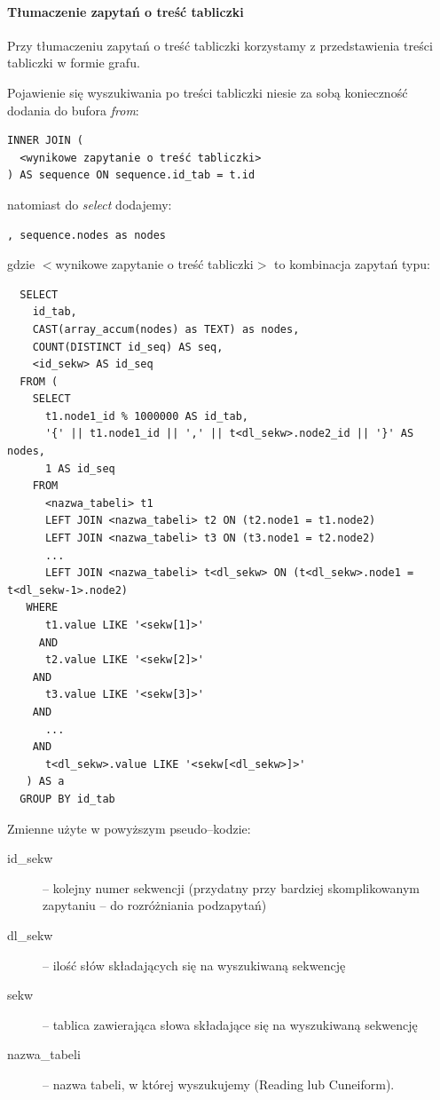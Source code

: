 \paragraph{Tłumaczenie zapytań o treść tabliczki}
Przy tłumaczeniu zapytań o treść tabliczki
korzystamy z przedstawienia treści tabliczki w formie grafu.

Pojawienie się wyszukiwania po treści tabliczki niesie za sobą konieczność dodania do bufora \textit{from}:
\begin{verbatim}
INNER JOIN (
  <wynikowe zapytanie o treść tabliczki>
) AS sequence ON sequence.id_tab = t.id
\end{verbatim}

natomiast do \textit{select} dodajemy:
\begin{verbatim}
, sequence.nodes as nodes
\end{verbatim}

gdzie $<$wynikowe zapytanie o treść tabliczki$>$ to kombinacja zapytań typu:
\begin{verbatim}
  SELECT 
    id_tab, 
    CAST(array_accum(nodes) as TEXT) as nodes, 
    COUNT(DISTINCT id_seq) AS seq, 
    <id_sekw> AS id_seq
  FROM (
    SELECT
      t1.node1_id % 1000000 AS id_tab,
      '{' || t1.node1_id || ',' || t<dl_sekw>.node2_id || '}' AS nodes,
      1 AS id_seq
    FROM
      <nazwa_tabeli> t1
      LEFT JOIN <nazwa_tabeli> t2 ON (t2.node1 = t1.node2)
      LEFT JOIN <nazwa_tabeli> t3 ON (t3.node1 = t2.node2)
      ...
      LEFT JOIN <nazwa_tabeli> t<dl_sekw> ON (t<dl_sekw>.node1 = t<dl_sekw-1>.node2)
   WHERE
      t1.value LIKE '<sekw[1]>'
     AND
      t2.value LIKE '<sekw[2]>'
    AND
      t3.value LIKE '<sekw[3]>'
    AND
      ...
    AND
      t<dl_sekw>.value LIKE '<sekw[<dl_sekw>]>'
   ) AS a 
  GROUP BY id_tab
\end{verbatim}
Zmienne użyte w powyższym pseudo--kodzie:
\begin{description}
 \item[id\_sekw] -- kolejny numer sekwencji (przydatny przy bardziej skomplikowanym zapytaniu -- do rozróżniania podzapytań)
 \item[dl\_sekw] -- ilość słów składających się na wyszukiwaną sekwencję
 \item[sekw] -- tablica zawierająca słowa składające się na wyszukiwaną sekwencję
\item[nazwa\_tabeli] -- nazwa tabeli, w której wyszukujemy (Reading lub Cuneiform).
 \end{description}

